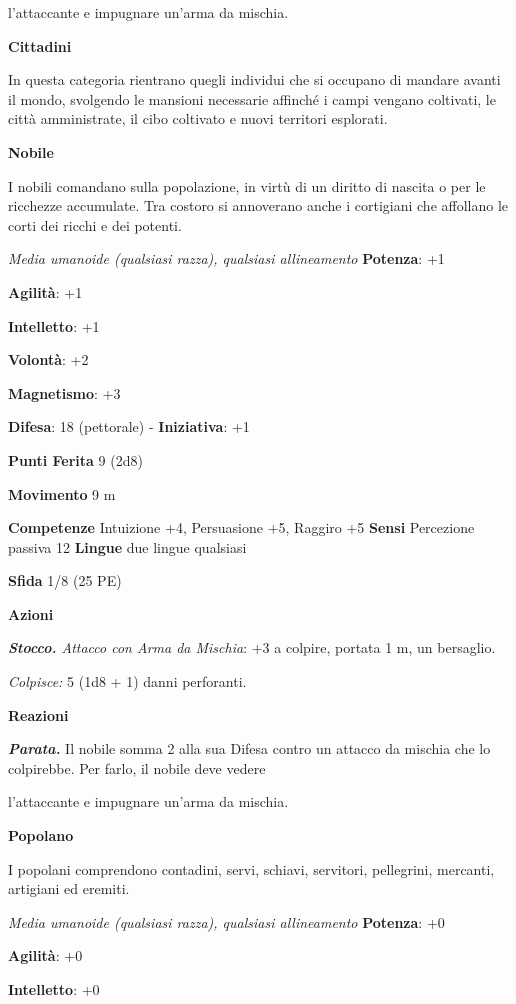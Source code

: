 \begin{multicols}{2}
l'attaccante e impugnare un'arma da mischia.

\textbf{Cittadini}

In questa categoria rientrano quegli individui che si occupano di
mandare avanti il mondo, svolgendo le mansioni necessarie affinché i
campi vengano coltivati, le città amministrate, il cibo coltivato e
nuovi territori esplorati.

\textbf{Nobile}

I nobili comandano sulla popolazione, in virtù di un diritto di nascita
o per le ricchezze accumulate. Tra costoro si annoverano anche i
cortigiani che affollano le corti dei ricchi e dei potenti.

\emph{Media umanoide (qualsiasi razza), qualsiasi allineamento}
\textbf{Potenza}: +1

\textbf{Agilità}: +1

\textbf{Intelletto}: +1

\textbf{Volontà}: +2

\textbf{Magnetismo}: +3

\textbf{Difesa}: 18 (pettorale) - \textbf{Iniziativa}: +1

\textbf{Punti Ferita} 9 (2d8)

\textbf{Movimento} 9 m

\textbf{Competenze} Intuizione +4, Persuasione +5, Raggiro +5
\textbf{Sensi} Percezione passiva 12 \textbf{Lingue} due lingue
qualsiasi

\textbf{Sfida} 1/8 (25 PE)\smallskip

\smallskip\textbf{Azioni}

\emph{\textbf{Stocco.} Attacco con Arma da Mischia}: +3 a colpire,
portata 1 m, un bersaglio.

\emph{Colpisce:} 5 (1d8 + 1) danni perforanti.

\textbf{Reazioni}

\emph{\textbf{Parata.}} Il nobile somma 2 alla sua Difesa contro un attacco
da mischia che lo colpirebbe. Per farlo, il nobile deve vedere

l'attaccante e impugnare un'arma da mischia.

\textbf{Popolano}

I popolani comprendono contadini, servi, schiavi, servitori, pellegrini,
mercanti, artigiani ed eremiti.

\emph{Media umanoide (qualsiasi razza), qualsiasi allineamento}
\textbf{Potenza}: +0

\textbf{Agilità}: +0

\textbf{Intelletto}: +0


\end{multicols}

